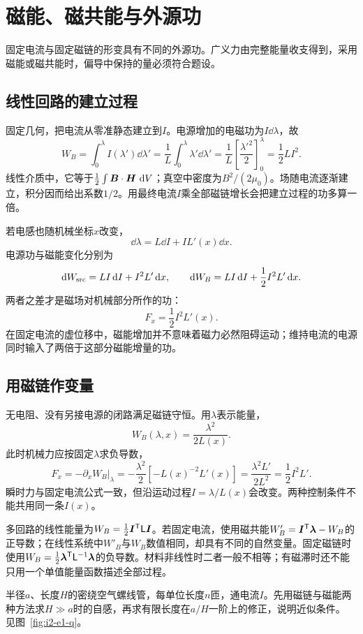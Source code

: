\section{磁能、磁共能与外源功}\label{sec:i2-energy}
固定电流与固定磁链的形变具有不同的外源功。广义力由完整能量收支得到，采用磁能或磁共能时，偏导中保持的量必须符合题设。

\subsection{线性回路的建立过程}
固定几何，把电流从零准静态建立到$I$。电源增加的电磁功为$I\dd\lambda$，故
\[W_B=\int_0^\lambda I(\lambda')\dd\lambda'
=\frac1L\int_0^\lambda\lambda'\dd\lambda'
=\frac1L\left[\frac{\lambda'^2}{2}\right]_0^\lambda
=\frac12LI^2.
\]
线性介质中，它等于$\frac12\int\bm{B}\cdot\bm{H}\,\mathop{}\!\mathrm d V$；真空中密度为$B^2/(2\mu_0)$。场随电流逐渐建立，积分因而给出系数$1/2$。用最终电流$I$乘全部磁链增长会把建立过程的功多算一倍。

若电感也随机械坐标$x$改变，
\[\dd\lambda=L\dd I+I L'(x)\dd x.
\]
电源功与磁能变化分别为
\[\mathop{}\!\mathrm d W_{\rm src}=LI\mathop{}\!\mathrm d I+I^2L'\mathop{}\!\mathrm d x,\qquad
\mathop{}\!\mathrm d W_B=LI\mathop{}\!\mathrm d I+\frac12I^2L'\mathop{}\!\mathrm d x.
\]
两者之差才是磁场对机械部分所作的功：
\[\boxed{F_x=\frac12I^2L'(x)}.
\]
在固定电流的虚位移中，磁能增加并不意味着磁力必然阻碍运动；维持电流的电源同时输入了两倍于这部分磁能增量的功。

\subsection{用磁链作变量}
无电阻、没有另接电源的闭路满足磁链守恒。用$\lambda$表示能量，
\[W_B(\lambda,x)=\frac{\lambda^2}{2L(x)}.
\]
此时机械力应按固定$\lambda$求负导数，
\[F_x=-\left.\partial_xW_B\right|_\lambda
=-\frac{\lambda^2}{2}\left[-L(x)^{-2}L'(x)\right]
=\frac{\lambda^2L'}{2L^2}=\frac12I^2L'.
\]
瞬时力与固定电流公式一致，但沿运动过程$I=\lambda/L(x)$会改变。两种控制条件不能共用同一条$I(x)$。

多回路的线性能量为$W_B=\frac12\bm{I}^{\mathsf T}\mathsf L\bm{I}$。若固定电流，使用磁共能$W'_B=\bm{I}^{\mathsf T}\bm{\lambda}-W_B$的正导数；在线性系统中$W'_B$与$W_B$数值相同，却具有不同的自然变量。固定磁链时使用$W_B=\frac12\bm{\lambda}^{\mathsf T}\mathsf L^{-1}\bm{\lambda}$的负导数。材料非线性时二者一般不相等；有磁滞时还不能只用一个单值能量函数描述全部过程。


\begin{example}[长螺线管与端部修正]\label{ex:i2-e1}
半径$a$、长度$H$的密绕空气螺线管，每单位长度$n$匝，通电流$I$。先用磁链与磁能两种方法求$H\gg a$时的自感，再求有限长度在$a/H$一阶上的修正，说明近似条件。 见图~\ref{fig:i2-e1-q}。
\end{example}

